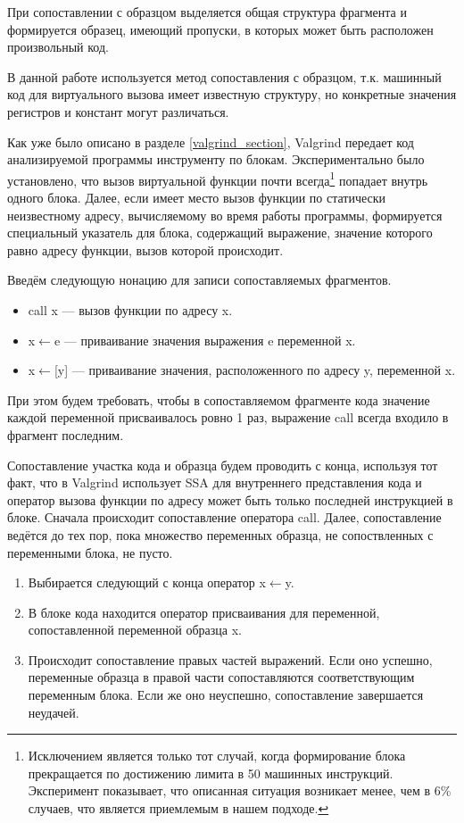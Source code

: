 \documentclass[a4paper,12pt,russian]{article}
\newcommand{\code}[1]{\textsf{#1}}
\begin{document}
При сопоставлении с образцом выделяется общая структура фрагмента и формируется образец, имеющий пропуски, в которых может быть расположен произвольный код.

В данной работе используется метод сопоставления с образцом, т.к. машинный код для виртуального вызова имеет известную структуру, но конкретные значения регистров и констант могут различаться.

Как уже было описано в разделе \ref{valgrind_section}, \code{Valgrind} передает код анализируемой программы инструменту по блокам. Экспериментально было установлено, что вызов виртуальной функции почти всегда\footnote{Исключением является только тот случай, когда формирование блока прекращается по достижению лимита в 50 машинных инструкций. Эксперимент показывает, что описанная ситуация возникает менее, чем в 6\% случаев, что является приемлемым в нашем подходе.} попадает внутрь одного блока.
Далее, если имеет место вызов функции по статически неизвестному адресу, вычисляемому во время работы программы, формируется специальный указатель для блока, содержащий выражение, значение которого равно адресу функции, вызов которой происходит.

Введём следующую нонацию для записи сопоставляемых фрагментов.
\begin{itemize}
    \item \code{call x} --- вызов функции по адресу \code{x}.
    \item \code{x}$\leftarrow$\code{e} --- приваивание значения выражения \code{e} переменной \code{x}.
    \item \code{x}$\leftarrow$\code{[y]} --- приваивание значения, расположенного по адресу \code{y}, переменной \code{x}.
\end{itemize}
При этом будем требовать, чтобы в сопоставляемом фрагменте кода значение каждой переменной присваивалось ровно 1 раз, выражение \code{call} всегда входило в фрагмент последним.

Сопоставление участка кода и образца будем проводить с конца, используя тот факт, что в \code{Valgrind} использует \code{SSA} для внутреннего представления кода и оператор вызова функции по адресу может быть только последней инструкцией в блоке.
Сначала происходит сопоставление оператора \code{call}. Далее, сопоставление ведётся до тех пор, пока множество переменных образца, не сопоствленных с переменными блока, не пусто.

\begin{enumerate}
    \item Выбирается следующий с конца оператор \code{x}$\leftarrow$\code{y}.
    \item В блоке кода находится оператор присваивания для переменной, сопоставленной переменной образца \code{x}.
    \item Происходит сопоставление правых частей выражений. Если оно успешно, переменные образца в правой части сопоставляются соответствующим переменным блока. Если же оно неуспешно, сопоставление завершается неудачей.
\end{enumerate}
\end{document}
